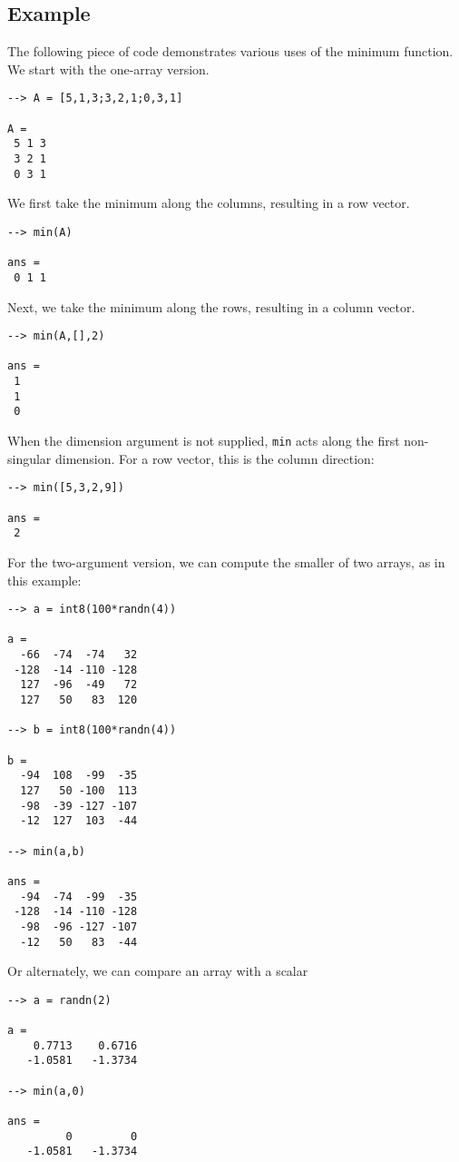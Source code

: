 \subsection{Example}

The following piece of code demonstrates various uses of the minimum
function.  We start with the one-array version.
\begin{verbatim}
--> A = [5,1,3;3,2,1;0,3,1]

A = 
 5 1 3 
 3 2 1 
 0 3 1 
\end{verbatim}
We first take the minimum along the columns, resulting in a row vector.
\begin{verbatim}
--> min(A)

ans = 
 0 1 1 
\end{verbatim}
Next, we take the minimum along the rows, resulting in a column vector.
\begin{verbatim}
--> min(A,[],2)

ans = 
 1 
 1 
 0 
\end{verbatim}
When the dimension argument is not supplied, \verb|min| acts along the first 
non-singular dimension.  For a row vector, this is the column direction:
\begin{verbatim}
--> min([5,3,2,9])

ans = 
 2 
\end{verbatim}

For the two-argument version, we can compute the smaller of two arrays,
as in this example:
\begin{verbatim}
--> a = int8(100*randn(4))

a = 
  -66  -74  -74   32 
 -128  -14 -110 -128 
  127  -96  -49   72 
  127   50   83  120 

--> b = int8(100*randn(4))

b = 
  -94  108  -99  -35 
  127   50 -100  113 
  -98  -39 -127 -107 
  -12  127  103  -44 

--> min(a,b)

ans = 
  -94  -74  -99  -35 
 -128  -14 -110 -128 
  -98  -96 -127 -107 
  -12   50   83  -44 
\end{verbatim}
Or alternately, we can compare an array with a scalar
\begin{verbatim}
--> a = randn(2)

a = 
    0.7713    0.6716 
   -1.0581   -1.3734 

--> min(a,0)

ans = 
         0         0 
   -1.0581   -1.3734 
\end{verbatim}
